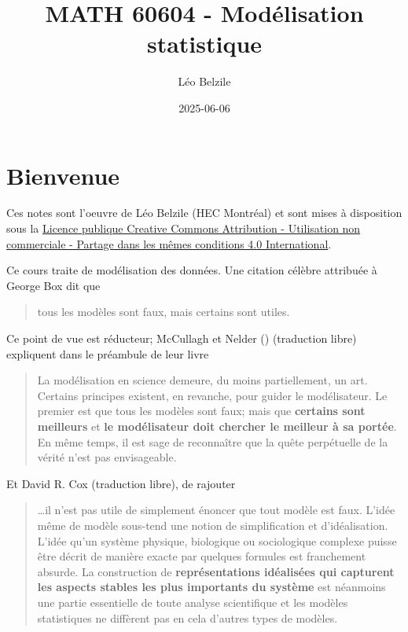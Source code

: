 \documentclass[
  11pt,
  letterpaper,
]{scrbook}
\title{MATH 60604 - Modélisation statistique}
\author{Léo Belzile}
\date{2025-06-06}
\renewcommand*\contentsname{Table des matières}
\newcommand\contentsname{Table des matières}
\theoremstyle{plain}
\theoremstyle{plain}
\theoremstyle{definition}
\theoremstyle{definition}
\theoremstyle{remark}
\begin{document}


\renewcommand*\contentsname{Table des matières}
{
\setcounter{tocdepth}{2}
\tableofcontents
}

\mainmatter
{}

\chapter*{Bienvenue}\label{bienvenue}


Ces notes sont l'oeuvre de Léo Belzile (HEC Montréal) et sont mises à
disposition sous la
\href{https://creativecommons.org/licenses/by-nc-sa/4.0/legalcode.fr}{Licence
publique Creative Commons Attribution - Utilisation non commerciale -
Partage dans les mêmes conditions 4.0 International}.

Ce cours traite de modélisation des données. Une citation célèbre
attribuée à George Box dit que

\begin{quote}
tous les modèles sont faux, mais certains sont utiles.
\end{quote}

Ce point de vue est réducteur; McCullagh et Nelder
() (traduction libre)
expliquent dans le préambule de leur livre

\begin{quote}
La modélisation en science demeure, du moins partiellement, un art.
Certains principes existent, en revanche, pour guider le modélisateur.
Le premier est que tous les modèles sont faux; mais que \textbf{certains
sont meilleurs} et \textbf{le modélisateur doit chercher le meilleur à
sa portée}. En même temps, il est sage de reconnaître que la quête
perpétuelle de la vérité n'est pas envisageable.
\end{quote}

Et David R. Cox (traduction libre), de rajouter

\begin{quote}
\ldots il n'est pas utile de simplement énoncer que tout modèle est
faux. L'idée même de modèle sous-tend une notion de simplification et
d'idéalisation. L'idée qu'un système physique, biologique ou
sociologique complexe puisse être décrit de manière exacte par quelques
formules est franchement absurde. La construction de
\textbf{représentations idéalisées qui capturent les aspects stables les
plus importants du système} est néanmoins une partie essentielle de
toute analyse scientifique et les modèles statistiques ne diffèrent pas
en cela d'autres types de modèles.
\end{quote}
\end{document}
